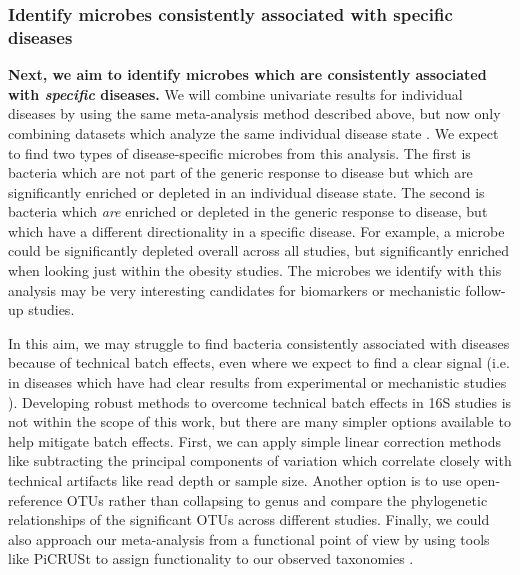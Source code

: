 \documentclass[12pt]{article}
\begin{document}
\subsubsection{Identify microbes consistently associated with specific diseases}
\textbf{Next, we aim to identify microbes which are consistently associated with \textit{specific}
diseases.} We will
combine univariate results for individual diseases by 
using the same meta-analysis method described above, but now only
combining datasets which analyze the same individual disease state \cite{zavkin-ztest-2011}. 
We expect to find two types of disease-specific microbes from this analysis.
The first is bacteria which are not part of the generic response to 
disease but which are significantly enriched or depleted in 
an individual disease state.
The second is bacteria which \textit{are} enriched or depleted in the generic
response to disease, but which have a different directionality
in a specific disease. For example,
a microbe could be significantly depleted overall across all studies,
but significantly enriched when looking just within the obesity studies.
The microbes we identify with this
analysis may be very interesting candidates for biomarkers or mechanistic follow-up studies.

In this aim, we may struggle to find bacteria consistently 
associated with diseases because of technical batch effects, even 
where we expect to find a clear signal (i.e. in diseases which have 
had clear results from experimental or mechanistic studies \cite{turnbaugh-energy_harvest-2006, ridaura-mouse_fmt-2013, crc_zeller}). 
Developing robust methods to overcome technical batch effects in 16S 
studies is not within the scope of this work, but there are many
simpler options available to help mitigate batch effects. 
First, we can apply simple linear correction methods 
like subtracting the principal components of variation which correlate closely with technical 
artifacts like read depth or sample size. 
Another option is to use open-reference OTUs rather than collapsing to genus
and compare the phylogenetic relationships of the significant OTUs across different studies. 
Finally, we could also approach our meta-analysis from a functional point of view by
using tools like PiCRUSt to assign functionality to our
observed taxonomies \cite{langille-picrust-2013}.
\end{document}
